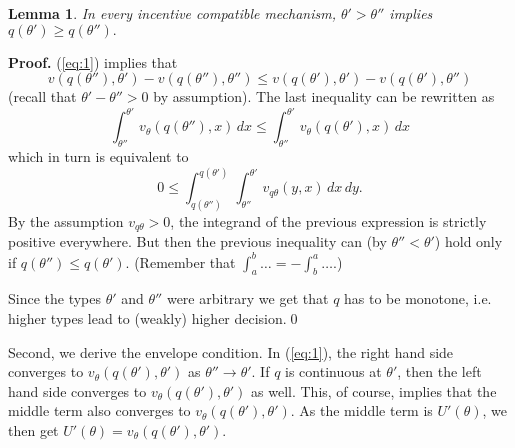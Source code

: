 \documentclass[12pt]{article}
\newtheorem{lemma}{Lemma}
\begin{document}
\begin{lemma}\label{lem:mon}
  In every incentive compatible mechanism, $\theta '>\theta ''$ implies $q(\theta ')\geq q(\theta '').$ 
\end{lemma}
\textbf{Proof. }(\ref{eq:1}) implies that 
\begin{equation*}
v(q(\theta ''),\theta ')-v(q(\theta ''),\theta '')\leq v(q(\theta '),\theta ')-v(q(\theta '),\theta '')
\end{equation*}
(recall that $\theta '-\theta ''>0$ by assumption). The last inequality can be rewritten as
\begin{equation*}
  \int_{\theta ''}^{\theta '}v_\theta (q(\theta ''),x)\,dx\leq \int_{\theta ''}^{\theta '}v_\theta (q(\theta '),x)\,dx
\end{equation*}
which in turn is equivalent to 
\begin{equation*}
0\leq \int_{q(\theta '')}^{q(\theta ')}\int_{\theta ''}^{\theta '}v_{q\theta} (y,x)\,dx\,dy.
\end{equation*}
By the assumption $v_{q\theta }>0$, the integrand of the previous expression is strictly positive everywhere. But then the previous inequality can (by $\theta ''<\theta '$) hold only if $q(\theta '')\leq q(\theta ')$. (Remember that $\int_a^b\dots=-\int_b^a\dots$.)

Since the types $\theta '$ and $\theta ''$ were arbitrary we get that $q$ has to be monotone, i.e. higher types lead to (weakly) higher decision.\qed

Second, we derive the envelope condition. In (\ref{eq:1}), the right hand side converges to $v_\theta (q(\theta '),\theta ')$ as $\theta ''\rightarrow\theta '$. If $q$ is continuous at $\theta '$, then the left hand side converges to $v_\theta (q(\theta '),\theta ')$ as well. This, of course, implies that the middle term also converges to $v_\theta (q(\theta '),\theta ')$. As the middle term is $U'(\theta )$, we then get $U'(\theta )=v_\theta (q(\theta '),\theta ')$. 
 
\end{document}
